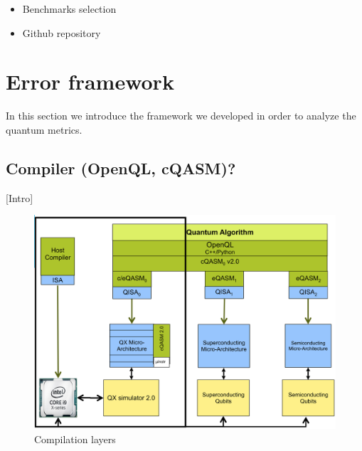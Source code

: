 \begin{itemize}
\item Benchmarks selection
\label{sec:org9ad4773}
\item Github repository
\label{sec:org19b3d62}
\end{itemize}

\section*{Error framework}
\label{sec:org8b63c1b}
In this section we introduce the framework we developed in order to analyze the quantum metrics.

\subsection*{Compiler (OpenQL, cQASM)?}
\label{sec:org7871930}
[Intro]


\begin{figure}[htbp]
\centering
\includegraphics[width=\textwidth]{figures/layers.png}
\caption{\label{fig:org9338876}
Compilation layers}
\end{figure}


